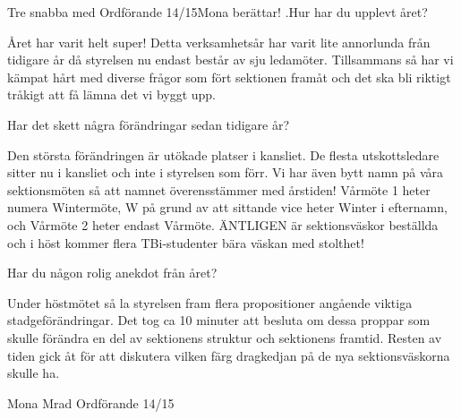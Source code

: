 \begin{news}{3}{Tre snabba med Ordförande 14/15}{Mona berättar!}{}
.Hur har du upplevt året?

Året har varit helt super! Detta
verksamhetsår har varit lite annorlunda från tidigare år då styrelsen
nu endast består av sju ledamöter. Tillsammans så har vi kämpat hårt
med diverse frågor som fört sektionen framåt och det ska bli riktigt
tråkigt att få lämna det vi byggt upp.

Har det skett några förändringar sedan tidigare år?

Den största
förändringen är utökade platser i kansliet. De flesta utskottsledare
sitter nu i kansliet och inte i styrelsen som förr. Vi har även bytt
namn på våra sektionsmöten så att namnet överensstämmer med årstiden!
Vårmöte 1 heter numera Wintermöte, W på grund av att sittande vice
heter Winter i efternamn, och Vårmöte 2 heter endast Vårmöte. ÄNTLIGEN är sektionsväskor beställda och i höst kommer flera TBi-studenter bära
väskan med stolthet!

Har du någon rolig anekdot från året?

Under höstmötet så la styrelsen
fram flera propositioner angående viktiga stadgeförändringar. Det tog
ca 10 minuter att besluta om dessa proppar som skulle förändra en del
av sektionens struktur och sektionens framtid. Resten av tiden gick
åt för att diskutera vilken färg dragkedjan på de nya sektionsväskorna
skulle ha.

Mona Mrad
Ordförande 14/15

\end{news}
